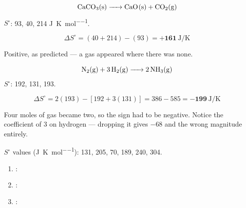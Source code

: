 \documentclass{apchem-notes}
\begin{document}
\begin{workedexample}
\[ \ce{CaCO3(s) -> CaO(s) + CO2(g)} \]
$S^\circ$:  93,  40,  214
\si{\joule\per\kelvin\per\mole}.

\[ \Delta S^\circ = (40 + 214) - (93) = \mathbf{+161}~
   \si{\joule\per\kelvin} \]

Positive, as predicted --- a gas appeared where there was none.
\end{workedexample}

\begin{workedexample}
\[ \ce{N2(g) + 3H2(g) -> 2NH3(g)} \]
$S^\circ$:  192,  131,  193.

\[ \Delta S^\circ = 2(193) - [192 + 3(131)]
   = 386 - 585 = \mathbf{-199}~\si{\joule\per\kelvin} \]

Four moles of gas became two, so the sign had to be negative. Notice the
coefficient of 3 on hydrogen --- dropping it gives $-68$ and the wrong
magnitude entirely.
\end{workedexample}


$S^\circ$ values (\si{\joule\per\kelvin\per\mole}):  131,
 205,  70,  189,  240,
 304.

\begin{enumerate}[leftmargin=*,itemsep=0.4em]
  \item {}: \workspace[2cm]
  \item {}: 
  \item {}: 
\end{enumerate}

\end{document}
